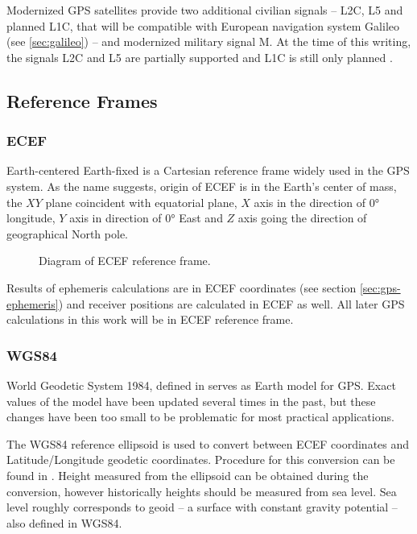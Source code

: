 Modernized GPS satellites provide two additional civilian signals --
L2C, L5 and planned L1C, that will be compatible with European navigation system Galileo
(see \ref{sec:galileo}) -- and modernized military signal M.
At the time of this writing, the signals L2C and L5 are partially supported and L1C is still only
planned \cite{gps-modernization-www}.

\subsection{Reference Frames}

\subsubsection{ECEF}
Earth-centered Earth-fixed is a Cartesian reference frame widely used in the GPS system.
As the name suggests, origin of ECEF is in the Earth's center of mass, the \(XY\) plane coincident
with equatorial plane, \(X\) axis in the direction of
\ang{0} longitude, \(Y\) axis in direction of \ang{0} East and \(Z\) axis going
the direction of geographical North pole.

\begin{figure}[h]
	\centering
	
	\caption{Diagram of ECEF reference frame.}
	\label{fig:ecef}
\end{figure}

Results of ephemeris calculations are in ECEF coordinates
(see section \ref{sec:gps-ephemeris}) and receiver positions are calculated
in ECEF as well.
All later GPS calculations in this work will be in ECEF reference frame.

\subsubsection{WGS84}
World Geodetic System 1984, defined in \cite{nima04}
serves as Earth model for GPS.
Exact values of the model have been updated several times in the past,
but these changes have been too small to be problematic for most practical
applications.

The WGS84 reference ellipsoid is used to convert between ECEF coordinates and
Latitude/Longitude geodetic coordinates.
Procedure for this conversion can be found in \cite{nima04}.
Height measured from the ellipsoid can be obtained during the conversion,
however historically heights should be measured from sea level.
Sea level roughly corresponds to geoid -- a surface with constant gravity
potential -- also defined in WGS84.

